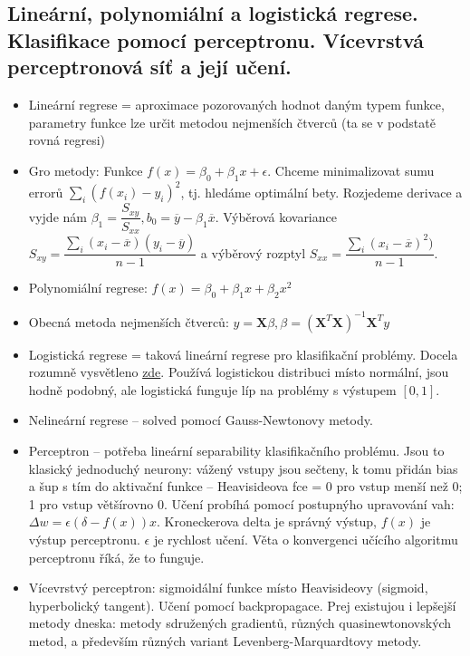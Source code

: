\documentclass[a4paper,hidelinks]{article}
\begin{document}
\subsection{Lineární, polynomiální a logistická regrese. Klasifikace pomocí perceptronu. Vícevrstvá perceptronová síť a její učení.}

\begin{itemize}
    \item Lineární regrese = aproximace pozorovaných hodnot daným typem funkce, parametry funkce lze určit metodou nejmenších čtverců (ta se v podstatě rovná regresi)
    \item Gro metody: Funkce $f(x) = \beta_0 + \beta_1 x + \epsilon$. Chceme minimalizovat sumu errorů $\sum_i (f(x_i) - y_i)^2$, tj. hledáme optimální bety. Rozjedeme derivace a vyjde nám $\beta_1 = \dfrac{S_{xy}}{S_{xx}}, b_0 = \overline{y} - \beta_1 \overline{x}$. Výběrová kovariance $S_{xy} = \dfrac{\sum_i (x_i - \overline{x})(y_i - \overline{y})}{n-1}$ a  výběrový rozptyl $S_{xx} = \dfrac{\sum_i (x_i - \overline{x})^2)}{n - 1}$.
    \item Polynomiální regrese: $f(x) = \beta_0 + \beta_1 x + \beta_2 x^2$
    \item Obecná metoda nejmenších čtverců: $y = \mathbf{X}\beta, \beta = (\mathbf{X}^T\mathbf{X})^{-1}\mathbf{X}^Ty$
    \item Logistická regrese = taková lineární regrese pro klasifikační problémy. Docela rozumně vysvětleno \href{https://www.quora.com/What-is-logistic-regression/answer/Thirumal-Venkat-1}{zde}. Používá logistickou distribuci místo normální, jsou hodně podobný, ale logistická funguje líp na problémy s výstupem $[0,1]$.
    \item Nelineární regrese -- solved pomocí Gauss-Newtonovy metody.
    \item Perceptron -- potřeba lineární separability klasifikačního problému. Jsou to klasický jednoduchý neurony: vážený vstupy jsou sečteny, k tomu přidán bias a šup s tím do aktivační funkce -- Heavisideova fce = 0 pro vstup menší než 0; 1 pro vstup většírovno 0. Učení probíhá pomocí postupnýho upravování vah: $\Delta w = \epsilon (\delta - f(x))x$. Kroneckerova delta je správný výstup, $f(x)$ je výstup perceptronu. $\epsilon$ je rychlost učení. Věta o konvergenci učícího algoritmu perceptronu říká, že to funguje.
    \item Vícevrstvý perceptron: sigmoidální funkce místo Heavisideovy (sigmoid, hyperbolický tangent). Učení pomocí backpropagace. Prej existujou i lepšejší metody dneska: metody sdružených gradientů, různých quasinewtonovských metod, a především různých variant Levenberg-Marquardtovy metody.
\end{itemize}
\end{document}
